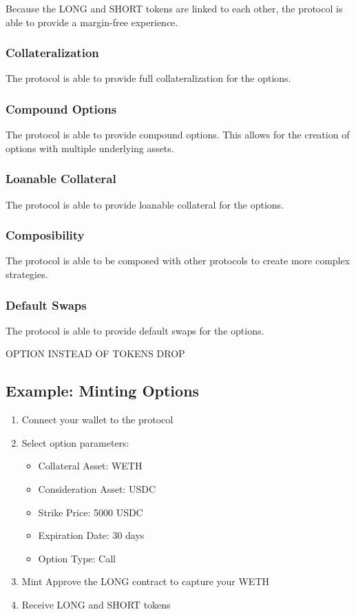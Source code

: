 \documentclass[%
 reprint,
 amsmath,amssymb,
 aps,
]{revtex4-2}
\begin{document}
Because the LONG and SHORT tokens are linked to each other, the protocol
is able to provide a margin-free experience.

\subsubsection{Collateralization}

The protocol is able to provide full collateralization for the options.


\subsubsection{Compound Options}

The protocol is able to provide compound options. This allows for the creation of options with multiple underlying assets.


\subsubsection{Loanable Collateral}

The protocol is able to provide loanable collateral for the options.


\subsubsection{Composibility}

The protocol is able to be composed with other protocols to create more complex strategies.


\subsubsection{Default Swaps}

The protocol is able to provide default swaps for the options.

OPTION INSTEAD OF TOKENS DROP

\subsection{Example: Minting Options}

\begin{enumerate}
\item
  Connect your wallet to the protocol
\item
  Select option parameters:
  \begin{itemize}
  \item
    Collateral Asset: WETH
  \item
    Consideration Asset: USDC
  \item
    Strike Price: 5000 USDC
  \item
    Expiration Date: 30 days
  \item
    Option Type: Call
  \end{itemize}
\item
  Mint Approve the LONG contract to capture your WETH
\item
  Receive LONG and SHORT tokens
\end{enumerate}
\end{document}

